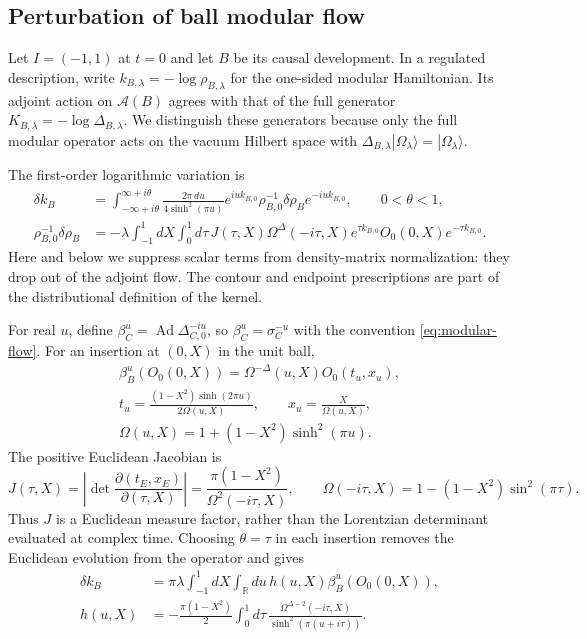 \documentclass[a4paper,11pt]{article}
\theoremstyle{definition}
\begin{document}
\subsection{Perturbation of ball modular flow}

Let $I=(-1,1)$ at $t=0$ and let $B$ be its causal development. In a regulated description, write $k_{B,\lambda}=-\log\rho_{B,\lambda}$ for the one-sided modular Hamiltonian. Its adjoint action on $\mathcal A(B)$ agrees with that of the full generator $K_{B,\lambda}=-\log\Delta_{B,\lambda}$. We distinguish these generators because only the full modular operator acts on the vacuum Hilbert space with $\Delta_{B,\lambda}|\Omega_\lambda\rangle=|\Omega_\lambda\rangle$.

The first-order logarithmic variation is \cite{BalakrishnanParrikar2020}
\begin{align}
 \delta k_B&=\int_{-\infty+i\theta}^{\infty+i\theta}
 \frac{2\pi\,du}{4\sinh^2(\pi u)}
 e^{iu k_{B,0}}\rho_{B,0}^{-1}\delta\rho_B e^{-iu k_{B,0}},
 \qquad 0<\theta<1,\nonumber\\
 \rho_{B,0}^{-1}\delta\rho_B
 &=-\lambda\int_{-1}^1dX\int_0^1d\tau\,
 J(\tau,X)\Omega^\Delta(-i\tau,X)
 e^{\tau k_{B,0}}O_0(0,X)e^{-\tau k_{B,0}}.
 \label{eq:cpt-density-variation}
\end{align}
Here and below we suppress scalar terms from density-matrix normalization: they drop out of the adjoint flow. The contour and endpoint prescriptions are part of the distributional definition of the kernel.

For real $u$, define $\beta_C^u=\operatorname{Ad}\Delta_{C,0}^{-iu}$, so $\beta_C^u=\sigma_C^{-u}$ with the convention \eqref{eq:modular-flow}. For an insertion at $(0,X)$ in the unit ball,
\begin{gather}
 \beta_B^u(O_0(0,X))=\Omega^{-\Delta}(u,X)O_0(t_u,x_u),\nonumber\\
 t_u=\frac{(1-X^2)\sinh(2\pi u)}{2\Omega(u,X)},
 \qquad x_u=\frac{X}{\Omega(u,X)},\nonumber\\
 \Omega(u,X)=1+(1-X^2)\sinh^2(\pi u).
 \label{eq:cpt-ball-flow}
\end{gather}
The positive Euclidean Jacobian is
\begin{equation}
 J(\tau,X)=\left|\det\frac{\partial(t_E,x_E)}{\partial(\tau,X)}\right|
 =\frac{\pi(1-X^2)}{\Omega^2(-i\tau,X)},
 \qquad \Omega(-i\tau,X)=1-(1-X^2)\sin^2(\pi\tau).
 \label{eq:cpt-euclidean-jacobian}
\end{equation}
Thus $J$ is a Euclidean measure factor, rather than the Lorentzian determinant evaluated at complex time. Choosing $\theta=\tau$ in each insertion removes the Euclidean evolution from the operator and gives
\begin{align}
 \delta k_B&=\pi\lambda\int_{-1}^1dX\int_{\mathbb R}du\,
 h(u,X)\beta_B^u(O_0(0,X)),\label{eq:deltaK}\\
 h(u,X)&=-\frac{\pi(1-X^2)}{2}\int_0^1d\tau\,
 \frac{\Omega^{\Delta-2}(-i\tau,X)}{\sinh^2(\pi(u+i\tau))}.
 \label{eq:cpt-h-kernel}
\end{align}
\end{document}
